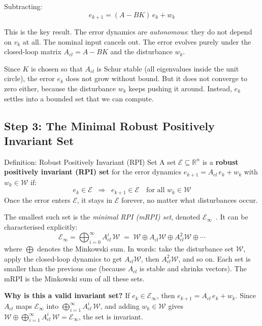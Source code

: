 Subtracting:
\begin{equation*}
	{e_{k+1} = (A - BK)\,e_k + w_k}
\end{equation*}

This is the key result. The error dynamics are \emph{autonomous}: they do not depend on $v_k$ at all. The nominal input cancels out. The error evolves purely under the closed-loop matrix $A_{cl} = A - BK$ and the disturbance $w_k$.

Since $K$ is chosen so that $A_{cl}$ is Schur stable (all eigenvalues inside the unit circle), the error $e_k$ does not grow without bound. But it does not converge to zero either, because the disturbance $w_k$ keeps pushing it around. Instead, $e_k$ settles into a bounded set that we can compute.

\subsection{Step 3: The Minimal Robust Positively Invariant Set}

\begin{defnbox}{Definition: Robust Positively Invariant (RPI) Set}
	A set $\mathcal{E} \subseteq \mathbb{R}^n$ is a \textbf{robust positively invariant (RPI) set} for the error dynamics $e_{k+1} = A_{cl}\,e_k + w_k$ with $w_k \in \mathcal{W}$ if:
	\[
	e_k \in \mathcal{E} \;\;\Longrightarrow\;\; e_{k+1} \in \mathcal{E} \quad \text{for all } w_k \in \mathcal{W}
	\]
	Once the error enters $\mathcal{E}$, it stays in $\mathcal{E}$ forever, no matter what disturbances occur.
\end{defnbox}

The smallest such set is the \emph{minimal RPI (mRPI) set}, denoted $\mathcal{E}_\infty$~\cite{Rakovic2005}. It can be characterised explicitly:
\begin{equation} \label{eq:mrpi}
	\mathcal{E}_\infty = \bigoplus_{i=0}^{\infty} A_{cl}^i\, \mathcal{W} \;=\; \mathcal{W} \oplus A_{cl}\mathcal{W} \oplus A_{cl}^2\mathcal{W} \oplus \cdots
\end{equation}
where $\bigoplus$ denotes the Minkowski sum. In words: take the disturbance set $\mathcal{W}$, apply the closed-loop dynamics to get $A_{cl}\mathcal{W}$, then $A_{cl}^2\mathcal{W}$, and so on. Each set is smaller than the previous one (because $A_{cl}$ is stable and shrinks vectors). The mRPI is the Minkowski sum of all these sets.

\textbf{Why is this a valid invariant set?} If $e_k \in \mathcal{E}_\infty$, then $e_{k+1} = A_{cl}\,e_k + w_k$. Since $A_{cl}$ maps $\mathcal{E}_\infty$ into $\bigoplus_{i=1}^{\infty} A_{cl}^i\,\mathcal{W}$, and adding $w_k \in \mathcal{W}$ gives $\mathcal{W} \oplus \bigoplus_{i=1}^{\infty} A_{cl}^i\,\mathcal{W} = \mathcal{E}_\infty$, the set is invariant.

